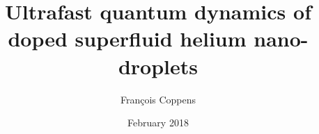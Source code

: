 \title{Ultrafast quantum dynamics of doped superfluid helium nano-droplets}
\author{Fran\c{c}ois Coppens}
\date{February 2018}
\maketitle